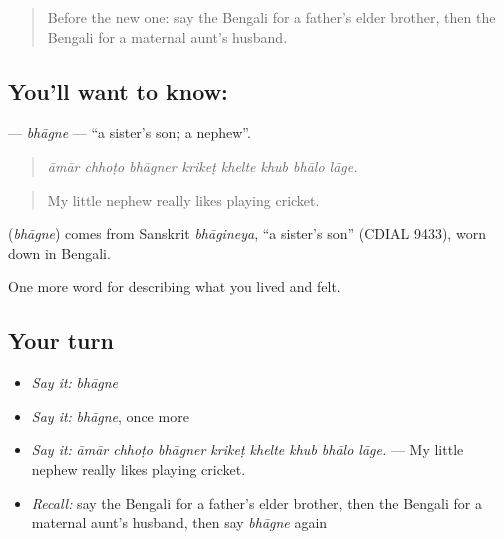 \label{lesson:BN-C482-bhagne}



\begin{quote}
Before the new one: say the Bengali for a father's elder brother, then the Bengali for a maternal aunt's husband.
\end{quote}

\subsection*{You'll want to know: }
\textbf{} — \emph{bhāgne} — \textquotedblleft{}a sister's son; a nephew\textquotedblright{}.

\begin{quote}
       
\end{quote}

\begin{quote}
\emph{āmār chhoṭo bhāgner krikeṭ khelte khub bhālo lāge.}
\end{quote}

\begin{quote}
My little nephew really likes playing cricket.
\end{quote}

\begin{cousinweb}
\textbf{} (\emph{bhāgne}) comes from Sanskrit \emph{bhāgineya}, \textquotedblleft{}a sister's son\textquotedblright{} (CDIAL 9433), worn down in Bengali.
\end{cousinweb}

\begin{grammarlens}[title={What you've built}]
One more word for describing what you lived and felt.
\end{grammarlens}

\subsection*{Your turn}
\begin{itemize}
\raggedright
  \item \emph{Say it:} \emph{bhāgne}
  \item \emph{Say it:} \emph{bhāgne}, once more
  \item \emph{Say it:} \emph{āmār chhoṭo bhāgner krikeṭ khelte khub bhālo lāge.} — My little nephew really likes playing cricket.
  \item \emph{Recall:} say the Bengali for a father's elder brother, then the Bengali for a maternal aunt's husband, then say \emph{bhāgne} again
\end{itemize}

